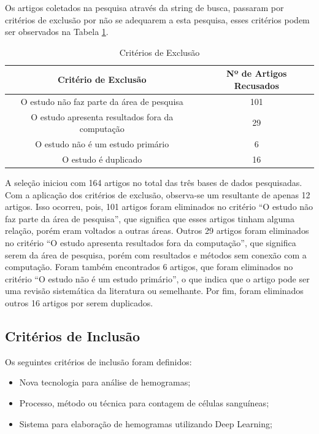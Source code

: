 Os artigos coletados na pesquisa através da string de busca, passaram por critérios de exclusão por não se adequarem a esta pesquisa, esses critérios podem ser observados na Tabela \ref{tbl:exclusao}. 

\begin{table}[!htb]
	\centering
	\caption{Critérios de Exclusão}
	\label{tbl:exclusao}
	\begin{tabular}{|c|c|}
		\hline
		\textbf{Critério de Exclusão}                    & \textbf{Nº de Artigos Recusados} \\ \hline
		O estudo não faz parte da área de pesquisa       & 101                               \\ \hline
		O estudo apresenta resultados fora da computação & 29                                \\ \hline
		O estudo não é um estudo primário               & 6                                 \\ \hline
		O estudo é duplicado                              & 16                                \\ \hline
	\end{tabular}
	\vspace{6pt}
\end{table}

A seleção iniciou com 164 artigos no total das três bases de dados pesquisadas. Com a aplicação dos critérios de exclusão, observa-se um resultante de apenas 12 artigos. Isso ocorreu, pois, 101 artigos foram eliminados no critério ``O estudo não faz parte da área de pesquisa'', que significa que esses artigos tinham alguma relação, porém eram voltados a outras áreas. Outros 29 artigos foram eliminados no critério ``O estudo apresenta resultados fora da computação'', que significa serem da área de pesquisa, porém com resultados e métodos sem conexão com a computação. Foram também encontrados 6 artigos, que foram eliminados no critério ``O estudo não é um estudo primário'', o que indica que o artigo pode ser uma revisão sistemática da literatura ou semelhante. Por fim, foram eliminados outros 16 artigos por serem duplicados.

\subsection{Critérios de Inclusão}

Os seguintes critérios de inclusão foram definidos:
\begin{itemize}
	\item Nova tecnologia para análise de hemogramas;
	\item Processo, método ou técnica para contagem de células sanguíneas;
	\item Sistema para elaboração de hemogramas utilizando Deep Learning;
\end{itemize}


